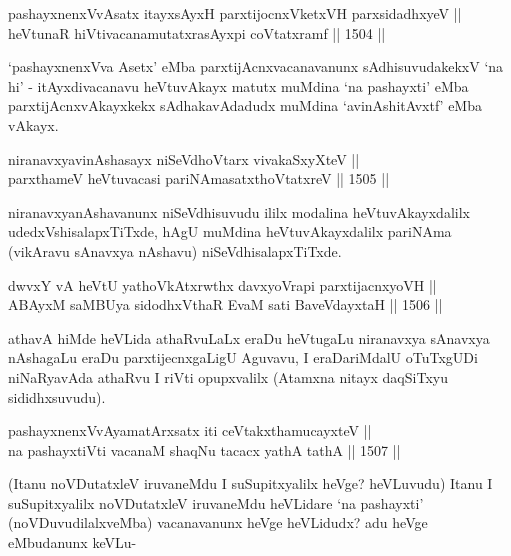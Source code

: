 \begin{shl}
pashayxnenxVvA\s \s satx itayxsAyxH parxtijocnxVketxVH parxsidadhxyeV || \\
heVtunaR hiVtivacanamutatxrasAyxpi coVtatxramf ||  1504 ||  
\end{shl}

\begin{artha}
`pashayxnenxVva Asetx' eMba parxtijAcnxvacanavanunx sAdhisuvudakekxV `na hi' - itAyxdivacanavu heVtuvAkayx matutx muMdina `na pashayxti' eMba parxtijAcnxvAkayxkekx sAdhakavAdadudx muMdina `avinAshitAvxtf' eMba vAkayx.
\end{artha}


\begin{shl}
niranavxyavinAshasayx niSeVdhoV\s tarx vivakaSxyXteV ||  \\
parxthameV heVtuvacasi pariNAmasatxthoVtatxreV ||  1505 ||  
\end{shl}

\begin{artha}
niranavxyanAshavanunx niSeVdhisuvudu ililx modalina heVtuvAkayxdalilx udedxVshisalapxTiTxde, hAgU muMdina heVtuvAkayxdalilx pariNAma (vikAravu sAnavxya nAshavu) niSeVdhisalapxTiTxde.
\end{artha}


\begin{shl}
dwvxY vA heVtU yathoVkAtxrwthx davxyoVrapi parxtijacnxyoVH || \\
ABAyxM saMBUya sidodhxV\s thaR EvaM sati BaveVdayxtaH ||  1506 ||  
\end{shl}

\begin{artha}
athavA hiMde heVLida athaRvuLaLx eraDu heVtugaLu niranavxya sAnavxya nAshagaLu eraDu parxtijecnxgaLigU Aguvavu, I eraDariMdalU oTuTxgUDi niNaRyavAda athaRvu I riVti opupxvalilx (Atamxna nitayx daqSiTxyu sididhxsuvudu).
\end{artha}

\begin{shl}
pashayxnenxVvAyamatArx\s \s satx iti ceVtakxthamucayxteV || \\
na pashayxtiVti vacanaM shaqNu tacacx yathA tathA ||  1507 ||  
\end{shl}

\begin{artha}
(Itanu noVDutatxleV iruvaneMdu I suSupitxyalilx heVge? heVLuvudu) Itanu I suSupitxyalilx noVDutatxleV iruvaneMdu heVLidare `na pashayxti' (noVDuvudilalxveMba) vacanavanunx heVge heVLidudx? adu heVge eMbudanunx keVLu-
\end{artha}

